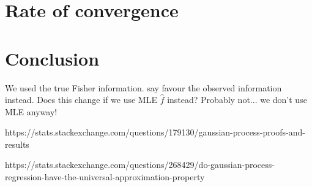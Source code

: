 \documentclass[a4paper,showframe,11pt,draft]{report}
\begin{document}
\section{Rate of convergence}

\section{Conclusion}
We used the true Fisher information. \citet{efron1978assessing} say favour the observed information instead. Does this change if we use MLE $\hat f$ instead? Probably not... we don't use MLE anyway!

https://stats.stackexchange.com/questions/179130/gaussian-process-proofs-and-results

https://stats.stackexchange.com/questions/268429/do-gaussian-process-regression-have-the-universal-approximation-property

\hClosingStuffStandalone
\end{document}
